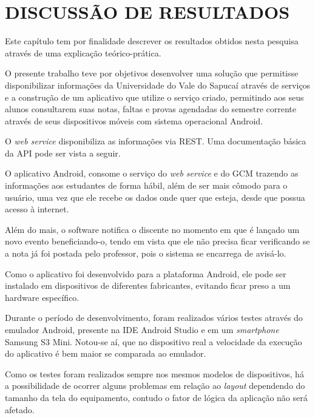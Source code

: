 \chapter{DISCUSSÃO DE RESULTADOS} 

    \par Este capítulo tem por finalidade descrever os resultados obtidos nesta
pesquisa através de uma explicação teórico-prática.

    \par O presente trabalho teve por objetivos desenvolver uma solução que
permitisse disponibilizar informações da Universidade do Vale do Sapucaí
através de serviços e a construção de um aplicativo que utilize o serviço
criado, permitindo aos seus alunos consultarem suas notas, faltas e provas
agendadas do semestre corrente através de seus dispositivos móveis com sistema
operacional Android.

    \par O \textit{web service} disponibiliza as informações via REST.
Uma documentação básica da API pode ser vista a seguir.

    
    
    \par O aplicativo Android, consome o serviço do \textit{web service} e do GCM
trazendo as informações aos estudantes de forma hábil, além de ser mais cômodo
para o usuário, uma vez que ele recebe os dados onde quer que esteja, desde que
possua acesso à internet.

    \par Além do mais, o software notifica o discente no momento em que é lançado
um novo evento beneficiando-o, tendo em vista que ele não precisa ficar
verificando se a nota já foi postada pelo professor, pois o sistema se
encarrega de avisá-lo.

    \par Como o aplicativo foi desenvolvido para a plataforma Android, ele pode ser
instalado em dispositivos de diferentes fabricantes, evitando ficar preso a um
hardware específico.

    \par Durante o período de desenvolvimento, foram realizados vários testes
através do emulador Android, presente na IDE Android Studio e em um
\textit{smartphone} Samsung S{3} Mini. Notou-se aí, que no dispositivo real a
velocidade da execução do aplicativo é bem maior se comparada ao emulador.

    \par Como os testes foram realizados sempre nos mesmos modelos de dispositivos,
há a possibilidade de ocorrer alguns problemas em relação ao \textit{layout}
dependendo do tamanho da tela do equipamento, contudo o fator de lógica da
aplicação não será afetado.

